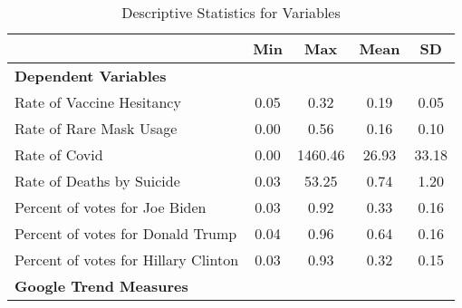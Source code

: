 \begin{table}[!h]

\caption{\label{tab:a1_desc_stats}Descriptive Statistics for Variables}
\centering
\fontsize{8}{10}\selectfont

\begin{tabular}{lcccc}
\toprule
 & \textbf{Min} & \textbf{Max} & \textbf{Mean} & \textbf{SD} \\ \midrule

\multicolumn{4}{l}{\textbf{Dependent Variables}} \\\hline

Rate of Vaccine Hesitancy & \num{0.05} & \num{0.32} & \num{0.19} & \num{0.05}\\
Rate of Rare Mask Usage & \num{0.00} & \num{0.56} & \num{0.16} & \num{0.10}\\
Rate of Covid & \num{0.00} & \num{1460.46} & \num{26.93} & \num{33.18}\\
Rate of Deaths by Suicide & \num{0.03} & \num{53.25} & \num{0.74} & \num{1.20}\\
Percent of votes for Joe Biden & \num{0.03} & \num{0.92} & \num{0.33} & \num{0.16}\\
Percent of votes for Donald Trump & \num{0.04} & \num{0.96} & \num{0.64} & \num{0.16}\\
Percent of votes for Hillary Clinton & \num{0.03} & \num{0.93} & \num{0.32} & \num{0.15}\\

\multicolumn{4}{l}{\textbf{Google Trend Measures}} \\\hline


\end{tabular}
\end{table}
